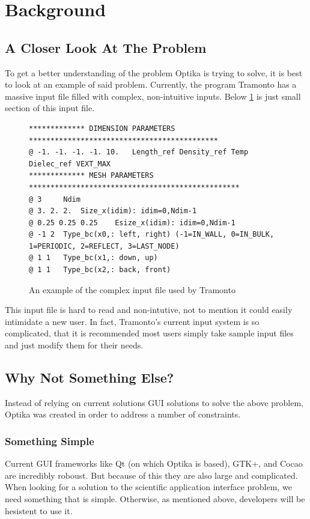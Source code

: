 \section{Background}
\subsection{A Closer Look At The Problem}
To get a better understanding of the problem Optika is trying to solve, it is
best to look at an example of said problem. Currently, the program Tramonto has
a massive input file filled with complex, non-intuitive inputs. Below
\ref{tramontoInputFigure} is just small section of this input file.
\begin{figure}
  \centering
  {\footnotesize
  \begin{verbatim}
************* DIMENSION PARAMETERS ********************************************
@ -1. -1. -1. -1. 10. 	Length_ref Density_ref Temp Dielec_ref VEXT_MAX 
************* MESH PARAMETERS *************************************************
@ 3 	Ndim 
@ 3. 2. 2. 	Size_x(idim): idim=0,Ndim-1 
@ 0.25 0.25 0.25 	Esize_x(idim): idim=0,Ndim-1 
@ -1 2 	Type_bc(x0,: left, right) (-1=IN_WALL, 0=IN_BULK, 1=PERIODIC, 2=REFLECT, 3=LAST_NODE) 
@ 1 1 	Type_bc(x1,: down, up) 
@ 1 1 	Type_bc(x2,: back, front) 
  \end{verbatim}
  }
  \caption[Tramonto Input]{An example of the complex input file used by Tramonto}
  \label{tramontoInputFigure}
\end{figure}
This input file is hard to read and non-intutive, not to mention it could 
easily intimidate
a new user. In fact, Tramonto's current input system is so complicated, 
that it is recommended most users simply take sample input files and just 
modify them for their needs.

\subsection{Why Not Something Else?}
Instead of relying on current solutions GUI solutions to solve the above problem, Optika was created in order to address
a number of constraints.
\subsubsection{Something Simple}
Current GUI frameworks like Qt (on which Optika is based), GTK+, and Cocao are incredibly roboust. But
because of this they are also large and complicated. When looking for a solution to the 
scientific application interface problem, we need something that is simple. Otherwise, as mentioned
above, developers will be hesistent to use it.

